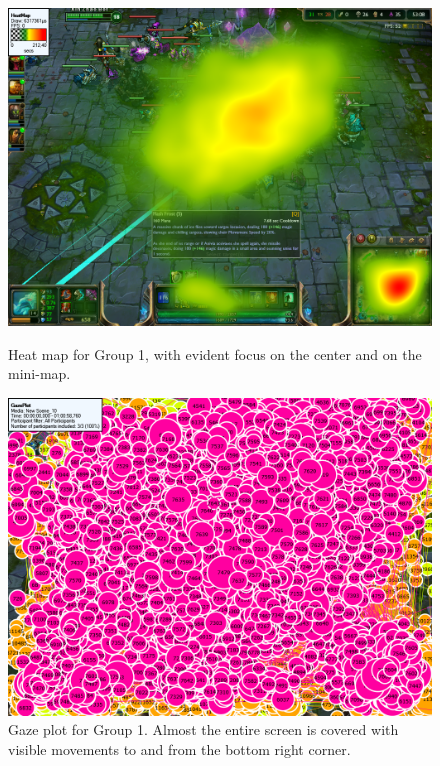 \documentclass{report}
\begin{document}
\begin{figure}[!ht]
\begin{minipage}[t]{0.45\linewidth}
\centering
\includegraphics[width=\textwidth]{images/heatmap/Noobs}
\caption{Heat map for Group 1, with evident focus on the center and on the mini-map.}
\label{heat_noob}
\end{minipage}
\hspace{0.5cm}
\begin{minipage}[t]{0.45\linewidth}
\centering
\includegraphics[width=\textwidth]{images/gazeplot/Noobs}
\caption{Gaze plot for Group 1. Almost the entire screen is covered with visible movements to and from the bottom right corner.}
\label{gaze_noob}
\end{minipage}
\end{figure}
\end{document}
